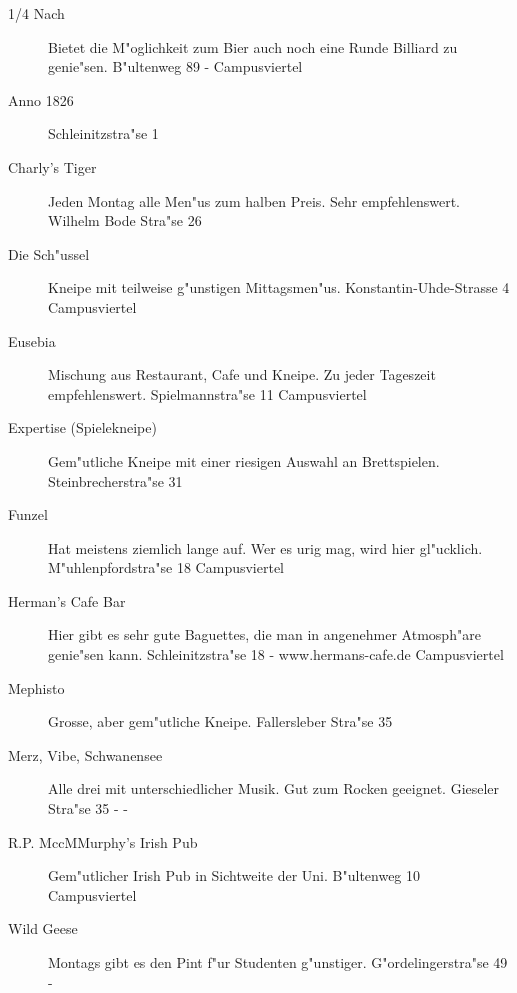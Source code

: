 \begin{description}

\item[1/4 Nach]
Bietet die M"oglichkeit zum Bier auch noch eine Runde Billiard zu genie"sen.
B"ultenweg 89 - 
Campusviertel

\item[Anno 1826]
Schleinitzstra"se 1

\item[Charly's Tiger]
Jeden Montag alle Men"us zum halben Preis. Sehr empfehlenswert.
Wilhelm Bode Stra"se 26

\item[Die Sch"ussel]
Kneipe mit teilweise g"unstigen Mittagsmen"us.
Konstantin-Uhde-Strasse 4
Campusviertel

\item[Eusebia]
Mischung aus Restaurant, Cafe und Kneipe. Zu jeder Tageszeit empfehlenswert.
Spielmannstra"se 11
Campusviertel

\item[Expertise (Spielekneipe)]
Gem"utliche Kneipe mit einer riesigen Auswahl an Brettspielen.
Steinbrecherstra"se 31

\item[Funzel]
Hat meistens ziemlich lange auf. Wer es urig mag, wird hier gl"ucklich.
M"uhlenpfordstra"se 18
Campusviertel

\item[Herman's Cafe Bar]
Hier gibt es sehr gute Baguettes, die man in angenehmer Atmosph"are genie"sen kann.
Schleinitzstra"se 18 - www.hermans-cafe.de
Campusviertel

\item[Mephisto]
Grosse, aber gem"utliche Kneipe.
Fallersleber Stra"se 35

\item[Merz, Vibe, Schwanensee]
Alle drei mit unterschiedlicher Musik. Gut zum Rocken geeignet.
Gieseler Stra"se 35 -  - 

\item[R.P. MccMMurphy's Irish Pub]
Gem"utlicher Irish Pub in Sichtweite der Uni.
B"ultenweg 10
Campusviertel

\item[Wild Geese]
Montags gibt es den Pint f"ur Studenten g"unstiger.
G"ordelingerstra"se 49 - 

\end{description}
